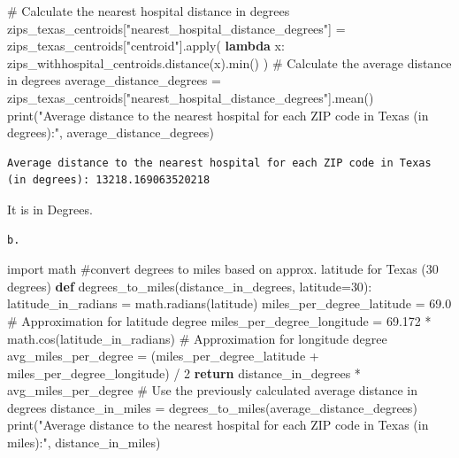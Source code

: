 \documentclass[
  letterpaper,
  DIV=11,
  numbers=noendperiod]{scrartcl}
\newenvironment{Shaded}{\begin{snugshade}}{\end{snugshade}}
\newcommand{\BuiltInTok}[1]{\textcolor[rgb]{0.00,0.23,0.31}{#1}}
\newcommand{\CommentTok}[1]{\textcolor[rgb]{0.37,0.37,0.37}{#1}}
\newcommand{\ControlFlowTok}[1]{\textcolor[rgb]{0.00,0.23,0.31}{\textbf{#1}}}
\newcommand{\DecValTok}[1]{\textcolor[rgb]{0.68,0.00,0.00}{#1}}
\newcommand{\FloatTok}[1]{\textcolor[rgb]{0.68,0.00,0.00}{#1}}
\newcommand{\ImportTok}[1]{\textcolor[rgb]{0.00,0.46,0.62}{#1}}
\newcommand{\KeywordTok}[1]{\textcolor[rgb]{0.00,0.23,0.31}{\textbf{#1}}}
\newcommand{\NormalTok}[1]{\textcolor[rgb]{0.00,0.23,0.31}{#1}}
\newcommand{\OperatorTok}[1]{\textcolor[rgb]{0.37,0.37,0.37}{#1}}
\newcommand{\StringTok}[1]{\textcolor[rgb]{0.13,0.47,0.30}{#1}}
\begin{document}
\begin{Shaded}
\begin{Highlighting}[]
\CommentTok{\# Calculate the nearest hospital distance in degrees}
\NormalTok{zips\_texas\_centroids[}\StringTok{"nearest\_hospital\_distance\_degrees"}\NormalTok{] }\OperatorTok{=}\NormalTok{ zips\_texas\_centroids[}\StringTok{"centroid"}\NormalTok{].}\BuiltInTok{apply}\NormalTok{(}
    \KeywordTok{lambda}\NormalTok{ x: zips\_withhospital\_centroids.distance(x).}\BuiltInTok{min}\NormalTok{()}
\NormalTok{)}
\CommentTok{\# Calculate the average distance in degrees}
\NormalTok{average\_distance\_degrees }\OperatorTok{=}\NormalTok{ zips\_texas\_centroids[}\StringTok{"nearest\_hospital\_distance\_degrees"}\NormalTok{].mean()}
\BuiltInTok{print}\NormalTok{(}\StringTok{"Average distance to the nearest hospital for each ZIP code in Texas (in degrees):"}\NormalTok{, average\_distance\_degrees)}
\end{Highlighting}
\end{Shaded}

\begin{verbatim}
Average distance to the nearest hospital for each ZIP code in Texas (in degrees): 13218.169063520218
\end{verbatim}

It is in Degrees.

\begin{verbatim}
b.  
\end{verbatim}

\begin{Shaded}
\begin{Highlighting}[]
\ImportTok{import}\NormalTok{ math}
\CommentTok{\#convert degrees to miles based on approx. latitude for Texas (30 degrees)}
\KeywordTok{def}\NormalTok{ degrees\_to\_miles(distance\_in\_degrees, latitude}\OperatorTok{=}\DecValTok{30}\NormalTok{):}
\NormalTok{    latitude\_in\_radians }\OperatorTok{=}\NormalTok{ math.radians(latitude)}
\NormalTok{    miles\_per\_degree\_latitude }\OperatorTok{=} \FloatTok{69.0}  \CommentTok{\# Approximation for latitude degree}
\NormalTok{    miles\_per\_degree\_longitude }\OperatorTok{=} \FloatTok{69.172} \OperatorTok{*}\NormalTok{ math.cos(latitude\_in\_radians)  }\CommentTok{\# Approximation for longitude degree}
\NormalTok{    avg\_miles\_per\_degree }\OperatorTok{=}\NormalTok{ (miles\_per\_degree\_latitude }\OperatorTok{+}\NormalTok{ miles\_per\_degree\_longitude) }\OperatorTok{/} \DecValTok{2}
    \ControlFlowTok{return}\NormalTok{ distance\_in\_degrees }\OperatorTok{*}\NormalTok{ avg\_miles\_per\_degree}
\CommentTok{\# Use the previously calculated average distance in degrees}
\NormalTok{distance\_in\_miles }\OperatorTok{=}\NormalTok{ degrees\_to\_miles(average\_distance\_degrees)}
\BuiltInTok{print}\NormalTok{(}\StringTok{"Average distance to the nearest hospital for each ZIP code in Texas (in miles):"}\NormalTok{, distance\_in\_miles)}
\end{Highlighting}
\end{Shaded}
\end{document}
